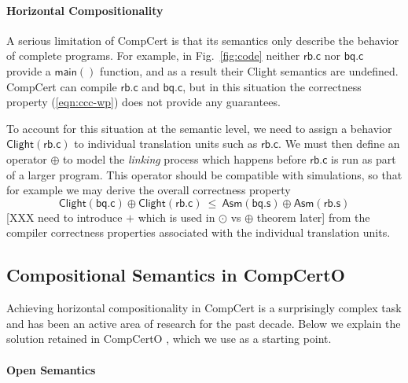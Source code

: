 \documentclass[acmsmall,screen,review,anonymous,nonacm]{acmart}
\newcommand{\kw}[1]{\ensuremath{ \mathsf{#1} }}
\begin{document}

\paragraph{Horizontal Compositionality} %

A serious limitation of CompCert
is that its semantics
only describe the behavior of complete programs.
For example, in Fig.~\ref{fig:code}
neither $\kw{rb.c}$ nor $\kw{bq.c}$ provide a $\kw{main}()$ function,
and as a result their Clight semantics are undefined.
CompCert can compile $\kw{rb.c}$ and $\kw{bq.c}$,
but in this situation
the correctness property (\ref{eqn:ccc-wp})
does not provide any guarantees.

To account for this situation
at the semantic level,
we need to assign a behavior $\kw{Clight}(\kw{rb.c})$
to individual translation units such as $\kw{rb.c}$.
We must then define an operator $\oplus$ to model the \emph{linking} process
which happens before $\kw{rb.c}$
is run as part of a larger program.
This operator should be compatible with simulations,
so that for example we may derive the overall correctness property
\[
  \kw{Clight}(\kw{bq.c}) \oplus \kw{Clight}(\kw{rb.c})
  \:\le\:
  \kw{Asm}(\kw{bq.s}) \oplus \kw{Asm}(\kw{rb.s})
\]
[XXX need to introduce $+$ which is used in $\odot$ vs $\oplus$ theorem later]
from the compiler correctness properties
associated with the individual translation units.



\subsection{Compositional Semantics in CompCertO} \label{sec:compcerto} %

Achieving horizontal compositionality in CompCert
is a surprisingly complex task and
has been an active area of research for the past decade.
Below we explain the solution retained in CompCertO
\cite{compcerto},
which we use as a starting point.

\paragraph{Open Semantics} %
\end{document}
